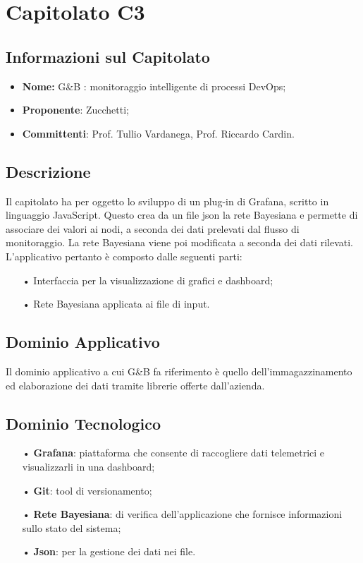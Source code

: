 \section{Capitolato C3}

\subsection{Informazioni sul Capitolato}

\begin{itemize}
	\item \textbf{Nome:} G\&{B} : monitoraggio intelligente di processi DevOps;
	\item \textbf{Proponente}: Zucchetti;
	\item \textbf{Committenti}: Prof. Tullio Vardanega, Prof. Riccardo Cardin.
\end{itemize}

\subsection{Descrizione}
Il capitolato ha per oggetto lo sviluppo di un plug-in di Grafana, scritto in linguaggio JavaScript. Questo crea da un file json la rete Bayesiana e permette di associare dei valori ai nodi, a seconda dei dati prelevati dal {flusso} di monitoraggio.
La rete Bayesiana viene poi modificata a seconda dei dati rilevati. 
L'applicativo pertanto è composto dalle seguenti parti: 

\begin{itemize}

\item[•] Interfaccia per la visualizzazione di grafici e dashboard;
\item[•] Rete Bayesiana applicata ai file di input.

\end{itemize}

\subsection{Dominio Applicativo}
Il dominio applicativo a cui G\&{B} fa riferimento è quello dell'immagazzinamento ed elaborazione dei dati tramite librerie offerte dall'azienda. 

\subsection{Dominio Tecnologico}
\begin{itemize}

\item[•] \textbf{Grafana}: piattaforma che consente di raccogliere dati telemetrici e visualizzarli in una dashboard;
\item[•] \textbf{Git}: tool di versionamento;
\item[•] \textbf{Rete Bayesiana}: di verifica dell'applicazione che fornisce informazioni sullo stato del sistema;
\item[•] \textbf{Json}: per la gestione dei dati nei file.

\end{itemize}

